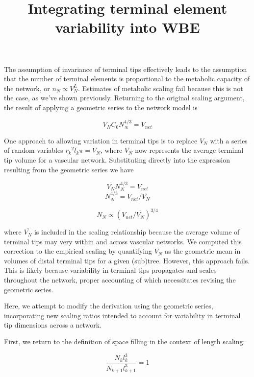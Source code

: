 \documentclass[]{article}
\title{Integrating terminal element variability into WBE}
\author{}
\date{\vspace{-2.5em}}
\begin{document}
\maketitle

The assumption of invariance of terminal tips effectively leads to the
assumption that the number of terminal elements is proportional to the
metabolic capacity of the network, or \(n_{N} \propto V_{N}^{L}\).
Estimates of metabolic scaling fail because this is not the case, as
we've shown previously. Returning to the original scaling argument, the
result of applying a geometric series to the network model is

\begin{equation}
\label{eq:1}
V_{N}C_{0}N_{N}^{4/3} = V_{net}
\end{equation}

One approach to allowing variation in terminal tips is to replace
\(V_{N}\) with a series of random variables
\(\overline{r_{k}}^{2} \overline{l_{k}} \pi = \overline{V_{N}}\), where
\(\overline{V_{N}}\) now represents the average terminal tip volume for
a vascular network. Substituting directly into the expression resulting
from the geometric series we have

\[\overline{V_{N}}N_{N}^{4/3} = V_{net}\]
\[N_{N}^{4/3} = V_{net}/\overline{V_{N}}\]

\begin{equation}
\label{eq:2}
N_{N} \propto (V_{net}/\overline{V_{N}})^{3/4}
\end{equation}

where \(\overline{V_{N}}\) is included in the scaling relationship
because the average volume of terminal tips may very within and across
vascular networks. We computed this correction to the empirical scaling
by quantifying \(\overline{V_{N}}\) as the geometric mean in volumes of
distal terminal tips for a given (sub)tree. However, this approach
fails. This is likely because variability in terminal tips propagates
and scales throughout the network, proper accounting of which
necessitates revising the geometric series.

Here, we attempt to modify the derivation using the geometric series,
incorporating new scaling ratios intended to account for variability in
terminal tip dimensions across a network.

First, we return to the definition of space filling in the context of
length scaling:

\begin{equation}
\frac{N_{k}l_{k}^{3}}{N_{k+1}l_{k+1}^{3}} = 1 
\end{equation}
\end{document}
